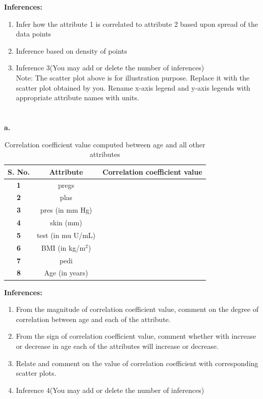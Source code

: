 \documentclass[12 pt, a4paper]{article}
\theoremstyle{definition}
\begin{document}
\textbf{\Large Inferences:}
\begin{enumerate}
   \item Infer how the attribute 1 is correlated to attribute 2 based upon spread of the data points
   \item Inference based on density of points
   \item Inference 3(You may add or delete the number of inferences)
\\Note: The scatter plot above is for illustration purpose. Replace it with the scatter plot obtained by you. Rename x-axis legend and y-axis legends with appropriate attribute names with units.

\end{enumerate}


\section{} 
\textbf{a.}
\begin{table}[H]
	\caption{Correlation coefficient value computed between age and all other attributes}
	\label{tab:Database}
	\centering
	\begin{tabular}{|c|c|c|}
	\hline
		\textbf{S. No.}& \textbf{Attribute} & \textbf{Correlation coefficient value}  \\ \hline
		
		\textbf{1}          & pregs          &                    \\ \hline
		\textbf{2}           & plas            &        \\ \hline
		\textbf{3}          & pres (in mm Hg)          &            \\ \hline
		\textbf{4}       & skin (mm)         &         \\ \hline
		\textbf{5}           & test (in mu U/mL)           &        \\ \hline
			\textbf{6}           & BMI (in kg/m$^{2 }$)           &               \\ \hline
		\textbf{7}          & pedi          &     \\ \hline
		\textbf{8}       & Age (in years)          &            \\ \hline
	
		
	\end{tabular}
\end{table}

\textbf{\Large Inferences:}
\begin{enumerate}
   \item From the magnitude of correlation coefficient value, comment on the degree of correlation between age and each of the attribute.
    \item From the sign of correlation coefficient value, comment whether with increase or decrease in age each of the attributes will increase or decrease.
    \item Relate and comment on the value of correlation coefficient with corresponding scatter plots.
   \item Inference 4(You may add or delete the number of inferences)
\end{enumerate}
\end{document}
